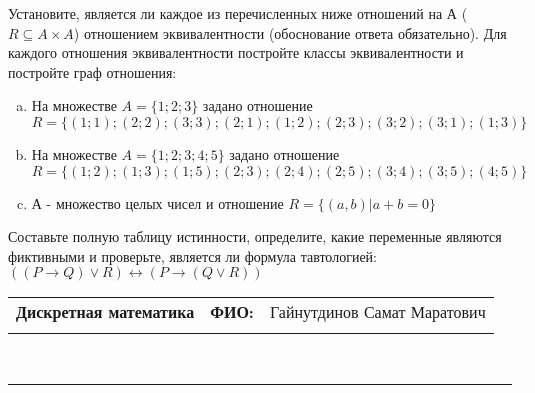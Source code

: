 \documentclass[10pt]{exam}
\newcommand{\class}{Дискретная математика}
\newcommand{\examdate}{}
\begin{document}
\begin{questions}
\question
Установите, является ли каждое из перечисленных ниже отношений на А ($R \subseteq A \times A$) отношением эквивалентности (обоснование ответа обязательно). Для каждого отношения эквивалентности постройте классы 
эквивалентности и постройте граф отношения:
\begin{enumerate} [a)]\setcounter{enumi}{0}
\item На множестве $A = \{1; 2; 3\}$ задано отношение $R = \{(1; 1); (2; 2); (3; 3); (2; 1); (1; 2); (2; 3); (3; 2); (3; 1); (1; 3)\}$
\item На множестве $A = \{1; 2; 3; 4; 5\}$ задано отношение $R = \{(1; 2); (1; 3); (1; 5); (2; 3); (2; 4); (2; 5); (3; 4); (3; 5); (4; 5)\}$
\item А - множество целых чисел и отношение $R = \{(a,b)|a + b = 0\}$
\end{enumerate}\question Составьте полную таблицу истинности, определите, какие переменные являются фиктивными и проверьте, является ли формула тавтологией:
$((P \rightarrow Q) \lor R) \leftrightarrow (P \rightarrow (Q \lor R))$

\end{questions}
\newpage
\begin{flushright}
\begin{tabular}{p{2.8in} r l}
\textbf{\class} & \textbf{ФИО:} &Гайнутдинов Самат Маратович
\\

\textbf{\examdate} &&\\
\end{tabular}\\
\end{flushright}
\rule[1ex]{\textwidth}{.1pt}
\end{document}
